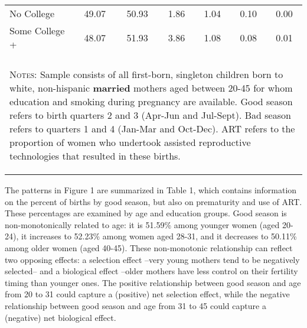 \documentclass[a4paper, 12 pt]{article}
\theoremstyle{plain}
\begin{document}
\begin{doublespace}
\begin{table}[htpb!]
\begin{center}
\begin{tabular}{lcccccc}
No College&49.07&50.93&1.86&1.04&0.10&0.00
\\
Some College +&48.07&51.93&3.86&1.08&0.08&0.01
\\
 &&&&&& \\
\midrule\multicolumn{7}{p{11.8cm}}{\begin{footnotesize}\textsc{Notes:} Sample consists of all first-born, singleton children born to white, non-hispanic \textbf{married} mothers aged between 20-45 for whom     education and smoking during pregnancy are available. Good season refers to birth quarters 2 and 3 (Apr-Jun and Jul-Sept).  Bad season refers to quarters 1 and 4 (Jan-Mar and Oct-Dec). ART refers to the proportion of  women who undertook assisted reproductive technologies that resulted in these births.
\end{footnotesize}} \\ \bottomrule
 \end{tabular}\end{center}\end{table}


The patterns in Figure 1 are summarized in Table 1, which contains information on the percent of births by good season, but also on prematurity and use of ART. These percentages are examined by age and education groups. Good season is non-monotonically related to age: it is 51.59\% among younger women (aged 20-24), it increases to 52.23\% among women aged 28-31, and it decreases to 50.11\% among older women (aged 40-45). These non-monotonic relationship can reflect two opposing effects: a selection effect --very young mothers tend to be negatively selected-- and a biological effect --older mothers have less control on their fertility timing than younger ones. The positive relationship between good season and age from 20 to 31 could capture a (positive) net selection effect, while the negative relationship between good season and age from 31 to 45 could capture a (negative) net biological effect.%


\end{doublespace}
\end{document}
